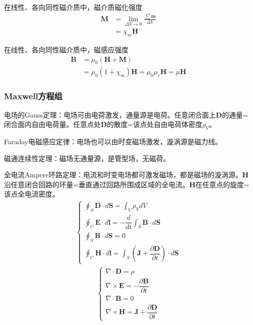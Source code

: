 \documentclass[withoutpreface,bwprint]{cumcmthesis} %
\begin{document}
在线性、各向同性磁介质中，磁介质磁化强度
\begin{align}
    \boldsymbol{M} &= \lim_{\Delta V \to 0}\frac{\sum \boldsymbol{m}}{\Delta V} \\
    &= \chi_m \boldsymbol{H}
\end{align}

在线性、各向同性磁介质中，磁感应强度
\begin{align}
    \boldsymbol{B} &= \mu_0 (\boldsymbol{H}+\boldsymbol{M})\\
    &= \mu_0 (1+\chi_m)\boldsymbol{H} = \mu_0 \mu_r \boldsymbol{H} = \mu \boldsymbol{H}
\end{align}

\subsubsection{Maxwell方程组}
电场的Gauss定理：电场可由电荷激发，通量源是电荷。任意闭合面上$\boldsymbol{D}$的通量=闭合面内自由电荷量。任意点处$\boldsymbol{D}$的散度=该点处自由电荷体密度$\rho_V$。

Faraday电磁感应定律：电场也可以由时变磁场激发，漩涡源是磁力线。

磁通连续性定理：磁场无通量源，是管型场，无磁荷。

全电流Ampere环路定理：电流和时变电场都可激发磁场，都是磁场的漩涡源。$\boldsymbol{H}$沿任意闭合回路的环量=垂直通过回路所围成区域的全电流。$\boldsymbol{H}$在任意点的旋度=该点全电流密度。
\begin{align}
    \begin{cases}
        \displaystyle \oint_S \boldsymbol{D}\cdot d\boldsymbol{S} = \displaystyle\int_V \rho_V dV\\
        \displaystyle\oint_C \boldsymbol{E}\cdot d\boldsymbol{l} = -\dfrac{d}{dt}\displaystyle\int_S \boldsymbol{B}\cdot d\boldsymbol{S}\\
        \displaystyle\oint_S \boldsymbol{B}\cdot d\boldsymbol{S} = 0\\
        \displaystyle\oint_C \boldsymbol{H}\cdot d\boldsymbol{l} = \displaystyle\int_S (\boldsymbol{J} + \dfrac{\partial \boldsymbol{D}}{\partial t})\cdot d\boldsymbol{S}
    \end{cases}
\end{align} 
\begin{align}
    \begin{cases}
        \nabla \cdot \boldsymbol{D} = \rho\\
        \nabla \times \boldsymbol{E} = -\dfrac{\partial \boldsymbol{B}}{\partial t}\\
        \nabla \cdot \boldsymbol{B} = 0\\
        \nabla \times \boldsymbol{H} = \boldsymbol{J} + \dfrac{\partial \boldsymbol{D}}{\partial t}
    \end{cases}
\end{align}
\end{document}
